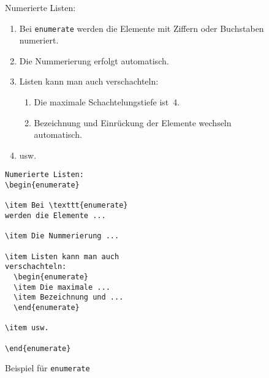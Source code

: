 \begin{figure}[!htbp]
\oben{\textwidth}
\exa
Numerierte Listen:
\begin{enumerate}
\relax %
\item Bei \texttt{enumerate} werden
die Elemente mit Ziffern oder Buchstaben numeriert.
\item Die Nummerierung erfolgt
automatisch.
\item Listen kann man auch
verschachteln:
  \begin{enumerate}
  \item Die maximale Schachtelungstiefe
  ist~4.
  \item Bezeichnung und Einrückung der Elemente
  wechseln automatisch.
  \end{enumerate}
\item usw.
\end{enumerate}
\exb
\begin{verbatim}
Numerierte Listen:
\begin{enumerate}
 
\item Bei \texttt{enumerate}
werden die Elemente ...
 
\item Die Nummerierung ...
 
\item Listen kann man auch
verschachteln:
  \begin{enumerate}
  \item Die maximale ...
  \item Bezeichnung und ...
  \end{enumerate}
 
\item usw.
 
\end{enumerate}
\end{verbatim}
\exc
\unten
\caption{Beispiel für \texttt{enumerate}} \label{enum}
\end{figure}
 
